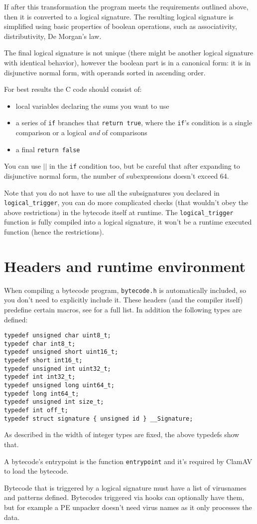 If after this transformation the program meets the requirements outlined above, then it is converted to a logical signature.
The resulting logical signature is simplified using basic properties of boolean operations, such as
associativity, distributivity, De Morgan's law.

The final logical signature is not unique (there might be another logical signature with identical behavior), however the boolean part is in a canonical form:
it is in disjunctive normal form, with operands sorted in ascending order.

For best results the C code should consist of:
\begin{itemize}
 \item local variables declaring the sums you want to use
 \item a series of \verb+if+ branches that \verb+return true+, where the \verb+if+'s condition is a single comparison or a logical \emph{and} of comparisons
 \item a final \verb+return false+
\end{itemize}

You can use $||$ in the \verb+if+ condition too, but be careful that after expanding to disjunctive normal form, the number of subexpressions doesn't exceed 64.

Note that you do not have to use all the subsignatures you declared in \verb+logical_trigger+, you can
do more complicated checks (that wouldn't obey the above restrictions) in the bytecode itself at runtime.
The \verb+logical_trigger+ function is fully compiled into a logical signature, it won't be a runtime executed function (hence the restrictions).

\section{Headers and runtime environment}
When compiling a bytecode program, \verb+bytecode.h+ is automatically included, so you don't need to explicitly include it.
These headers (and the compiler itself) predefine certain macros, see  for a full list.
In addition the following types are defined:
\begin{lstlisting}
typedef unsigned char uint8_t;
typedef char int8_t;
typedef unsigned short uint16_t;
typedef short int16_t;
typedef unsigned int uint32_t;
typedef int int32_t;
typedef unsigned long uint64_t;
typedef long int64_t;
typedef unsigned int size_t;
typedef int off_t;
typedef struct signature { unsigned id } __Signature;
\end{lstlisting}
As described in  the width of integer types are fixed, the above typedefs show that.

A bytecode's entrypoint is the function \verb+entrypoint+ and it's required by ClamAV to load the bytecode.

Bytecode that is triggered by a logical signature must have a list of virusnames and patterns defined.
Bytecodes triggered via hooks can optionally have them, but for example a PE unpacker doesn't need virus
names as it only processes the data.
